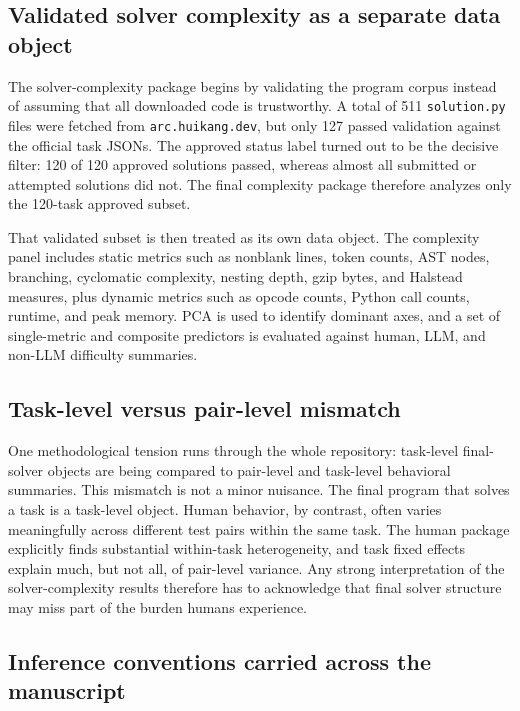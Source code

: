 \documentclass[11pt,letterpaper]{article}
\begin{document}
\subsection{Validated solver complexity as a separate data object}

The solver-complexity package begins by validating the program corpus instead of assuming that all downloaded code is trustworthy. A total of 511 \texttt{solution.py} files were fetched from \texttt{arc.huikang.dev}, but only 127 passed validation against the official task JSONs. The approved status label turned out to be the decisive filter: 120 of 120 approved solutions passed, whereas almost all submitted or attempted solutions did not. The final complexity package therefore analyzes only the 120-task approved subset.

That validated subset is then treated as its own data object. The complexity panel includes static metrics such as nonblank lines, token counts, AST nodes, branching, cyclomatic complexity, nesting depth, gzip bytes, and Halstead measures, plus dynamic metrics such as opcode counts, Python call counts, runtime, and peak memory. PCA is used to identify dominant axes, and a set of single-metric and composite predictors is evaluated against human, LLM, and non-LLM difficulty summaries.

\subsection{Task-level versus pair-level mismatch}

One methodological tension runs through the whole repository: task-level final-solver objects are being compared to pair-level and task-level behavioral summaries. This mismatch is not a minor nuisance. The final program that solves a task is a task-level object. Human behavior, by contrast, often varies meaningfully across different test pairs within the same task. The human package explicitly finds substantial within-task heterogeneity, and task fixed effects explain much, but not all, of pair-level variance. Any strong interpretation of the solver-complexity results therefore has to acknowledge that final solver structure may miss part of the burden humans experience.

\subsection{Inference conventions carried across the manuscript}
\end{document}
